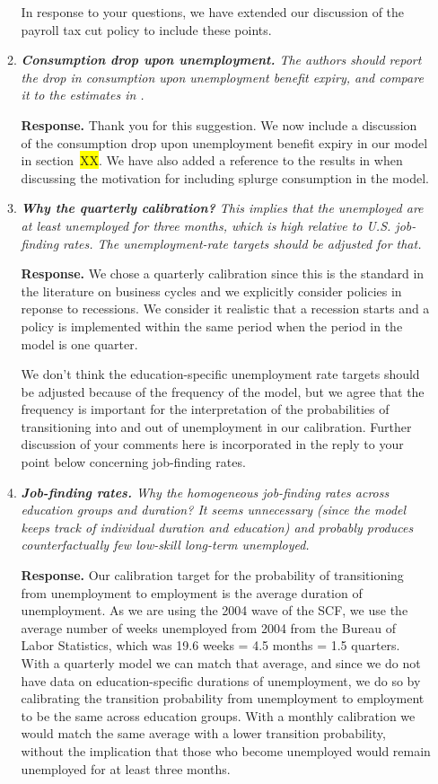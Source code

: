 \documentclass[12pt,letterpaper,english]{article}
\begin{document}
\begin{enumerate}
\begin{enumerate}
		In response to your questions, we have extended our discussion of the payroll tax cut policy to include these points. 

		\item \textit{\textbf{Consumption drop upon unemployment.} The authors should report the drop in consumption upon unemployment benefit expiry, and compare it to the estimates in \citet{ganongconsumer2019}.}

		\noindent \textbf{Response.} Thank you for this suggestion. We now include a discussion of the consumption drop upon unemployment benefit expiry in our model in section~\colorbox{yellow}{XX}. We have also added a reference to the results in \citet{ganongconsumer2019} when discussing the motivation for including splurge consumption in the model. 
	
		\item \textit{\textbf{Why the quarterly calibration?} This implies that the unemployed are at least unemployed for three months, which is high relative to U.S. job-finding rates. The unemployment-rate targets should be adjusted for that.}

		\noindent \textbf{Response.} We chose a quarterly calibration since this is the standard in the literature on business cycles and we explicitly consider policies in reponse to recessions. We consider it realistic that a recession starts and a policy is implemented within the same period when the period in the model is one quarter.
		
		We don't think the education-specific unemployment rate targets should be adjusted because of the frequency of the model, but we agree that the frequency is important for the interpretation of the probabilities of transitioning into and out of unemployment in our calibration. Further discussion of your comments here is incorporated in the reply to your point below concerning job-finding rates. 
		
		\item \textit{\textbf{Job-finding rates.} Why the homogeneous job-finding rates across education groups and duration? It seems unnecessary (since the model keeps track of individual duration and education) and probably produces counterfactually few low-skill long-term unemployed.}
		
		\noindent \textbf{Response.} Our calibration target for the probability of transitioning from unemployment to employment is the average duration of unemployment. As we are using the 2004 wave of the SCF, we use the average number of weeks unemployed from 2004 from the Bureau of Labor Statistics, which was 19.6 weeks = 4.5 months = 1.5 quarters. With a quarterly model we can match that average, and since we do not have data on education-specific durations of unemployment, we do so by calibrating the transition probability from unemployment to employment to be the same across education groups. With a monthly calibration we would match the same average with a lower transition probability, without the implication that those who become unemployed would remain unemployed for at least three months. 
		

\end{enumerate}
\end{enumerate}
\end{document}

